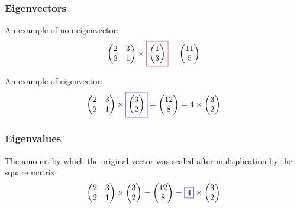 \documentclass{beamer}
\begin{document}
    \begin{frame}
        \frametitle{Eigenvectors}
        An example of non-eigenvector:
        \begin{equation}    %
            \colorlet{oldcolor}{black}
            \begin{pmatrix} 2 & 3 \\ 2 & 1 \end{pmatrix} \times \color{red} \boxed{\color{oldcolor} \begin{pmatrix} 1 \\ 3 \end{pmatrix} } \color{oldcolor} = \begin{pmatrix} 11 \\ 5 \end{pmatrix}
        \end{equation}

        An example of eigenvector:
        \begin{equation}    %
            \colorlet{oldcolor}{black}
            \begin{pmatrix} 2 & 3 \\ 2 & 1 \end{pmatrix} \times \color{blue} \boxed{\color{oldcolor} \begin{pmatrix} 3 \\ 2 \end{pmatrix} } \color{oldcolor} = \begin{pmatrix} 12 \\ 8 \end{pmatrix} = 4 \times \begin{pmatrix} 3 \\ 2 \end{pmatrix}
        \end{equation}

    \end{frame}

    \begin{frame}
        \frametitle{Eigenvalues}
        The amount by which the original vector was scaled after multiplication by the square matrix
        \begin{equation}    %
            \colorlet{oldcolor}{black}
            \begin{pmatrix} 2 & 3 \\ 2 & 1 \end{pmatrix} \times   \begin{pmatrix} 3 \\ 2 \end{pmatrix} = \begin{pmatrix} 12 \\ 8 \end{pmatrix} = \color{blue} \boxed{\color{oldcolor} 4} \color{oldcolor} \times \begin{pmatrix} 3 \\ 2 \end{pmatrix}
        \end{equation}
    \end{frame}
\end{document}
